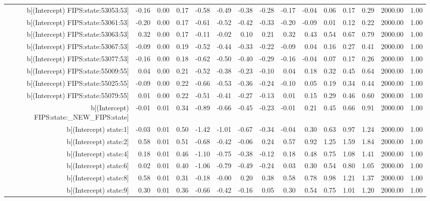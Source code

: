 \begin{table}[ht]
\begin{tabular}{rrrrrrrrrrrrrrr}
  b[(Intercept) FIPS:state:53053:53] & -0.16 & 0.00 & 0.17 & -0.58 & -0.49 & -0.38 & -0.28 & -0.17 & -0.04 & 0.06 & 0.17 & 0.29 & 2000.00 & 1.00 \\ 
  b[(Intercept) FIPS:state:53061:53] & -0.20 & 0.00 & 0.17 & -0.61 & -0.52 & -0.42 & -0.33 & -0.20 & -0.09 & 0.01 & 0.12 & 0.22 & 2000.00 & 1.00 \\ 
  b[(Intercept) FIPS:state:53063:53] & 0.32 & 0.00 & 0.17 & -0.11 & -0.02 & 0.10 & 0.21 & 0.32 & 0.43 & 0.54 & 0.67 & 0.79 & 2000.00 & 1.00 \\ 
  b[(Intercept) FIPS:state:53067:53] & -0.09 & 0.00 & 0.19 & -0.52 & -0.44 & -0.33 & -0.22 & -0.09 & 0.04 & 0.16 & 0.27 & 0.41 & 2000.00 & 1.00 \\ 
  b[(Intercept) FIPS:state:53077:53] & -0.16 & 0.00 & 0.18 & -0.62 & -0.50 & -0.40 & -0.29 & -0.16 & -0.04 & 0.07 & 0.17 & 0.26 & 2000.00 & 1.00 \\ 
  b[(Intercept) FIPS:state:55009:55] & 0.04 & 0.00 & 0.21 & -0.52 & -0.38 & -0.23 & -0.10 & 0.04 & 0.18 & 0.32 & 0.45 & 0.64 & 2000.00 & 1.00 \\ 
  b[(Intercept) FIPS:state:55025:55] & -0.09 & 0.00 & 0.22 & -0.66 & -0.53 & -0.36 & -0.24 & -0.10 & 0.05 & 0.19 & 0.34 & 0.44 & 2000.00 & 1.00 \\ 
  b[(Intercept) FIPS:state:55079:55] & 0.01 & 0.00 & 0.22 & -0.51 & -0.41 & -0.27 & -0.13 & 0.01 & 0.15 & 0.29 & 0.46 & 0.60 & 2000.00 & 1.00 \\ 
  b[(Intercept) FIPS:state:\_NEW\_FIPS:state] & -0.01 & 0.01 & 0.34 & -0.89 & -0.66 & -0.45 & -0.23 & -0.01 & 0.21 & 0.45 & 0.66 & 0.91 & 2000.00 & 1.00 \\ 
  b[(Intercept) state:1] & -0.03 & 0.01 & 0.50 & -1.42 & -1.01 & -0.67 & -0.34 & -0.04 & 0.30 & 0.63 & 0.97 & 1.24 & 2000.00 & 1.00 \\ 
  b[(Intercept) state:2] & 0.58 & 0.01 & 0.51 & -0.68 & -0.42 & -0.06 & 0.24 & 0.57 & 0.92 & 1.25 & 1.59 & 1.84 & 2000.00 & 1.00 \\ 
  b[(Intercept) state:4] & 0.18 & 0.01 & 0.46 & -1.10 & -0.75 & -0.38 & -0.12 & 0.18 & 0.48 & 0.75 & 1.08 & 1.41 & 2000.00 & 1.00 \\ 
  b[(Intercept) state:6] & 0.02 & 0.01 & 0.40 & -1.06 & -0.79 & -0.49 & -0.24 & 0.03 & 0.30 & 0.54 & 0.80 & 1.05 & 2000.00 & 1.00 \\ 
  b[(Intercept) state:8] & 0.58 & 0.01 & 0.31 & -0.18 & -0.00 & 0.20 & 0.38 & 0.58 & 0.78 & 0.98 & 1.21 & 1.37 & 2000.00 & 1.00 \\ 
  b[(Intercept) state:9] & 0.30 & 0.01 & 0.36 & -0.66 & -0.42 & -0.16 & 0.05 & 0.30 & 0.54 & 0.75 & 1.01 & 1.20 & 2000.00 & 1.00 \\ 

\end{tabular}
\end{table}

